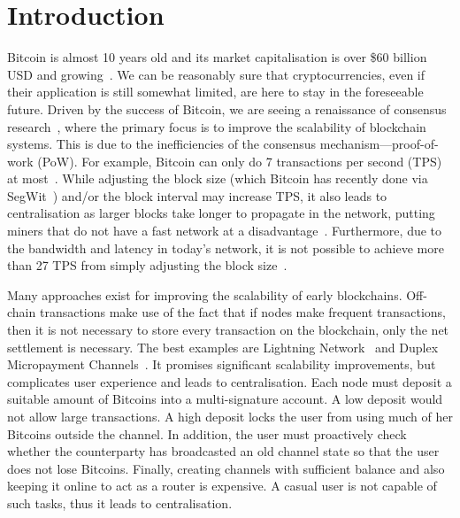 \section{Introduction}

Bitcoin is almost 10 years old and its market capitalisation is over \$60 billion USD and growing~\cite{bitcoinmarketcap}.
We can be reasonably sure that cryptocurrencies,
even if their application is still somewhat limited,
are here to stay in the foreseeable future.
Driven by the success of Bitcoin, we are seeing a renaissance of consensus research~\cite{miller2016honey, kogias2016enhancing, kokoris2017omniledger},
where the primary focus is to improve the scalability of blockchain systems.
This is due to the inefficiencies of the consensus mechanism---proof-of-work (PoW).
For example, Bitcoin can only do 7 transactions per second (TPS) at most~\cite{vukolic2015quest}.
While adjusting the block size (which Bitcoin has recently done via SegWit~\cite{segwit}) and/or the block interval may increase TPS,
it also leads to centralisation as larger blocks take longer to propagate in the network,
putting miners that do not have a fast network at a disadvantage~\cite{croman2016scaling}.
Furthermore, due to the bandwidth and latency in today's network,
it is not possible to achieve more than 27 TPS from simply adjusting the block size~\cite{croman2016scaling}.

Many approaches exist for improving the scalability of early blockchains.
Off-chain transactions make use of the fact that if nodes make frequent transactions,
then it is not necessary to store every transaction on the blockchain,
only the net settlement is necessary.
The best examples are Lightning Network~\cite{lightningnetwork} and Duplex Micropayment Channels~\cite{decker2015fast}.
It promises significant scalability improvements, but complicates user experience and leads to centralisation.
Each node must deposit a suitable amount of Bitcoins into a multi-signature account.
A low deposit would not allow large transactions.
A high deposit locks the user from using much of her Bitcoins outside the channel.
In addition, the user must proactively check whether the counterparty has broadcasted an old channel state so that the user does not lose Bitcoins.
Finally, creating channels with sufficient balance and also keeping it online to act as a router is expensive.
A casual user is not capable of such tasks, thus it leads to centralisation.

